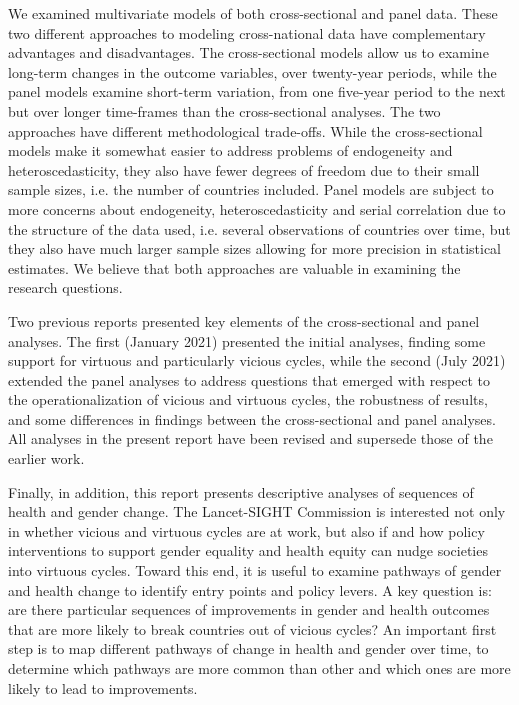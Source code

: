 \documentclass[12pt]{article}
\begin{document}
We examined multivariate models of both cross-sectional and panel data. These two different approaches to modeling cross-national data have complementary advantages and disadvantages.
The cross-sectional models allow us to examine long-term changes in the outcome variables, over twenty-year periods, while the panel models examine short-term variation, from one five-year period to the next but over longer time-frames than the cross-sectional analyses.
The two approaches have different methodological trade-offs. While the cross-sectional models make it somewhat easier to address problems of endogeneity and heteroscedasticity, they also have fewer degrees of freedom due to their small sample sizes, i.e. the number of countries included. Panel models are subject to more concerns about endogeneity, heteroscedasticity and serial correlation due to the structure of the data used, i.e. several observations of countries over time, but they also have much larger sample sizes allowing for more precision in statistical estimates. We believe that both approaches are valuable in examining the research questions.

Two previous reports presented key elements of the cross-sectional and panel analyses.
The first (January 2021) presented the initial analyses, finding some support for virtuous and particularly vicious cycles, while the second (July 2021) extended the panel analyses to address questions that emerged with respect to the operationalization of vicious and virtuous cycles, the robustness of results, and some differences in findings between the cross-sectional and panel analyses.
All analyses in the present report have been revised and supersede those of the earlier work.

Finally, in addition, this report presents descriptive analyses of sequences of health and gender change.
The Lancet-SIGHT Commission is interested not only in whether vicious and virtuous cycles are at work, but also if and how policy interventions to support gender equality and health equity can nudge societies into virtuous cycles.
Toward this end, it is useful to examine pathways of gender and health change to identify entry points and policy levers.
A key question is: are there particular sequences of improvements in gender and health outcomes that are more likely to break countries out of vicious cycles?
An important first step is to map different pathways of change in health and gender over time, to determine which pathways are more common than other and which ones are more likely to lead to improvements.
\end{document}
